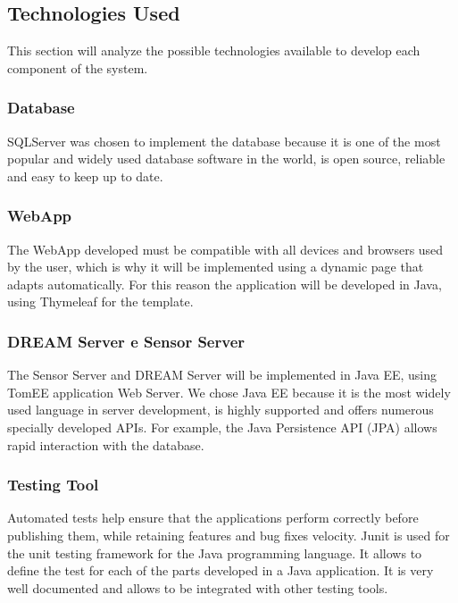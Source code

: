 \subsection{Technologies Used}
This section will analyze the possible technologies available to develop each component of the system.
\subsubsection{Database}
SQLServer was chosen to implement the database because it is one of the most popular and widely used database software in the world, is open source, reliable and easy to keep up to date.
\subsubsection{WebApp}
The WebApp developed must be compatible with all devices and browsers used by the user, which is why it will be implemented using a dynamic page that adapts automatically. For this reason the application will be developed in Java, using Thymeleaf for the template.
\subsubsection{DREAM Server e Sensor Server}
The Sensor Server and DREAM Server will be implemented in Java EE, using TomEE application Web Server. We chose Java EE because it is the most widely used language in server development, is highly supported and offers numerous specially developed APIs. For example, the Java Persistence API (JPA) allows rapid interaction with the database.
\subsubsection{Testing Tool}
Automated tests help ensure that the applications perform correctly before publishing them,
while retaining features and bug fixes velocity. Junit is used for the unit testing framework for the Java programming language. It allows to define the test for each of the parts developed in a Java application. It is very well documented and allows to be integrated with other testing tools.